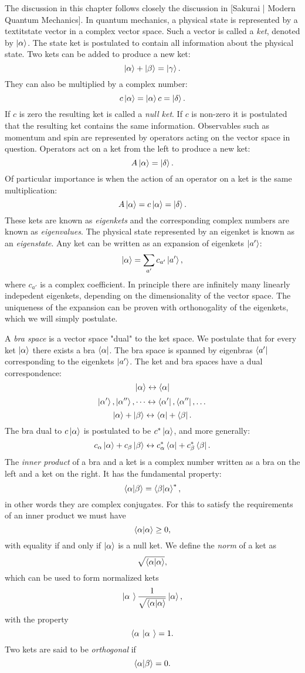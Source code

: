 The discussion in this chapter follows closely the discussion in
[Sakurai | Modern Quantum Mechanics].
\newline
In quantum mechanics, a physical state is represented by a textit{state vector}
in a complex vector space. Such a vector is called a \textit{ket}, denoted
by $\ket{\alpha}$. The state ket is postulated to contain all information
about the physical state. Two kets can be added to produce a new ket:
$$ \ket{\alpha} + \ket{\beta} = \ket{\gamma} .$$
They can also be multiplied by a complex number:
$$ c\ket{\alpha} = \ket{\alpha}c = \ket{\delta} .$$
If $c$ is zero the resulting ket is called a \textit{null ket}.
If $c$ is non-zero it is postulated that the resulting ket contains
the same information.
\newline
Observables such as momentum and spin are represented by operators
acting on the vector space in question. Operators
act on a ket from the left to produce a new ket:
$$ A \ket{\alpha} = \ket{\delta} .$$
Of particular importance is when the action of an operator
on a ket is the same multiplication:
$$ A \ket{\alpha} = c\ket{\alpha} = \ket{\delta} .$$
These kets are known as \textit{eigenkets} and the corresponding
complex numbers are known as \textit{eigenvalues}.
The physical state represented by an eigenket is known
as an \textit{eigenstate}. Any ket
can be written as an expansion of eigenkets $\ket{a'}$:
$$ \ket{\alpha} = \sum_{a'} c_{a'} \ket{a'} ,$$
where $c_{a'}$ is a complex coefficient. In principle
there are infinitely many linearly indepedent eigenkets,
depending on the dimensionality of the vector space.
The uniqueness of the expansion can be proven
with orthonogality of the eigenkets, which we will simply postulate.
\par
A \textit{bra space} is a vector space "dual" to the ket space.
We postulate that for every ket $\ket{\alpha}$ there exists a bra
$\bra{\alpha}$. The bra space is spanned by eigenbras $\bra{a'}$
corresponding to the eigenkets $\ket{a'}$. The ket and bra spaces
have a dual correspondence:
$$ \ket{\alpha} \leftrightarrow \bra{\alpha} $$
$$ \ket{\alpha '}, \ket{\alpha ''},\dots \leftrightarrow \bra{\alpha '}, \bra{\alpha ''},\dots $$
$$ \ket{\alpha} + \ket{\beta} \leftrightarrow \bra{\alpha} + \bra{\beta} .$$
The bra dual to $c \ket{\alpha}$ is postulated to be $c^* \ket{\alpha}$,
and more generally:
$$ c_{\alpha} \ket{\alpha} + c_{\beta} \ket{\beta} \leftrightarrow
c_{\alpha}^* \bra{\alpha} + c_{\beta}^* \bra{\beta} .$$
The \textit{inner product} of a bra and a ket is a complex number
written as a bra on the left and a ket on the right.
It has the fundamental property:
$$ \braket{\alpha | \beta} = \braket{\beta | \alpha}^* ,$$
in other words they are complex conjugates.
For this to satisfy the requirements of an inner product we must have
$$ \braket{\alpha | \alpha} \geq 0 ,$$
with equality if and only if $\ket{\alpha}$ is a null ket.
We define the \textit{norm} of a ket as
$$ \sqrt{\braket{\alpha | \alpha}} ,$$
which can be used to form normalized kets
$$ \ket{\alpha^{~}} \frac{1}{\sqrt{\braket{\alpha | \alpha}}} \ket{\alpha} ,$$
with the property
$$ \braket{\alpha^{~} | \alpha^{~}} = 1 .$$
Two kets are said to be \textit{orthogonal} if
$$ \braket{\alpha | \beta} = 0 .$$

